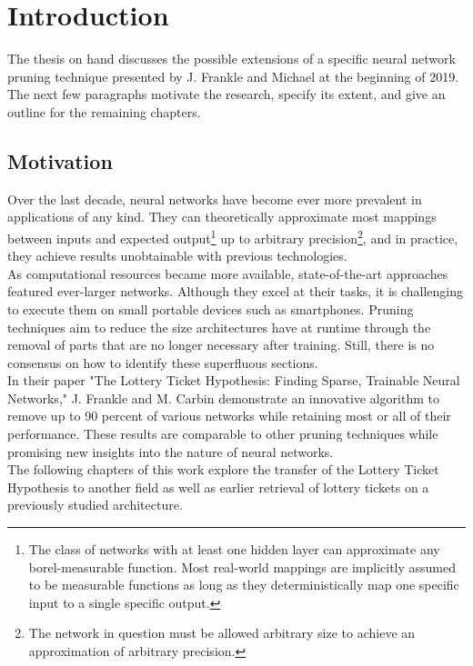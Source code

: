 \chapter{Introduction}
The thesis on hand discusses the possible extensions of a specific neural network pruning technique presented by J. Frankle and Michael at the beginning of 2019.\cite{LTH}\\
The next few paragraphs motivate the research,  specify its extent, and give an outline for the remaining chapters.

\section{Motivation}
Over the last decade, neural networks have become ever more prevalent in applications of any kind. They can theoretically approximate most mappings between inputs and expected output\footnote{The class of networks with at least one hidden layer can approximate any borel-measurable function. Most real-world mappings are implicitly assumed to be measurable functions as long as they deterministically map one specific input to a single specific output.
} up to arbitrary precision\footnote{The network in question must be allowed arbitrary size to achieve an approximation of arbitrary precision.
}\cite{Approximator}, and in practice, they achieve results unobtainable with previous technologies.\\ 
As computational resources became more available, state-of-the-art approaches featured ever-larger networks. Although they excel at their tasks, it is challenging to execute them on small portable devices such as smartphones. Pruning techniques aim to reduce the size architectures have at runtime through the removal of parts that are no longer necessary after training. Still, there is no consensus on how to identify these superfluous sections.\\
In their paper "The Lottery Ticket Hypothesis: Finding Sparse, Trainable Neural Networks," J. Frankle and M. Carbin demonstrate an innovative algorithm to remove up to 90 percent of various networks while retaining most or all of their performance. These results are comparable to other pruning techniques while promising new insights into the nature of neural networks.\cite{LTH}
\\
The following chapters of this work explore the transfer of the Lottery Ticket Hypothesis to another field as well as earlier retrieval of lottery tickets on a previously studied architecture.

